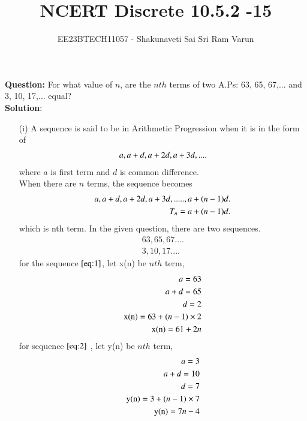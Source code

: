 \documentclass[journal,12pt,twocolumn]{IEEEtran}
\theoremstyle{remark}
\begin{document}

\vspace{3cm}

\title{NCERT Discrete 10.5.2 -15}
\author{EE23BTECH11057 - Shakunaveti Sai Sri Ram Varun$^{}$%
}
\maketitle
\newpage
\bigskip

\renewcommand{\thefigure}{\theenumi}
\renewcommand{\thetable}{\theenumi}
\vspace{2cm}
\textbf{Question: }
For what value of $ n$, are the $ nth$ terms of two A.Ps: 63, 65, 67,... and 3, 10, 17,... equal?\\
\vspace{0.5cm}
\textbf{Solution}:
\begin{enumerate}
    \item [(i)]
A sequence is said to be in Arithmetic Progression when it is in the form of
\begin{align}
\notag a, a+d, a+2d, a+3d,....
\end{align}
where $a$ is first term and $d$ is common difference.\\
When there are $ n$ terms, the sequence becomes
\begin{align}
\notag a, a+d, a+2d, a+3d,....., a+(n-1)d.\\
\notag T_n = a+(n-1)d.
\end{align}
which is nth term.
In the given question, there are two sequences.
\begin{align}
63, 65, 67....\label{eq:1}\\
3, 10, 17....\label{eq:2}
\end{align}
for the sequence $ \eqref{eq:1}$, let x(n) be $ nth$ term,
\begin{align}
\notag a = 63\\
\notag a+d = 65\\
\notag d = 2\\
\notag \text{x(n)} = 63 + (n-1)\times2\\
\text{x(n)} = 61 + 2n \label{eq:3}
\end{align}
for sequence $ \eqref{eq:2}$ , let y(n) be $ nth$ term,
\begin{align}
\notag a = 3 \\
\notag a+d = 10\\
\notag d = 7\\
\notag \text{y(n)} = 3 + (n-1)\times7\\
\text{y(n)} = 7n - 4 \label{eq:4}

\end{align}
\end{enumerate}
\end{document}
